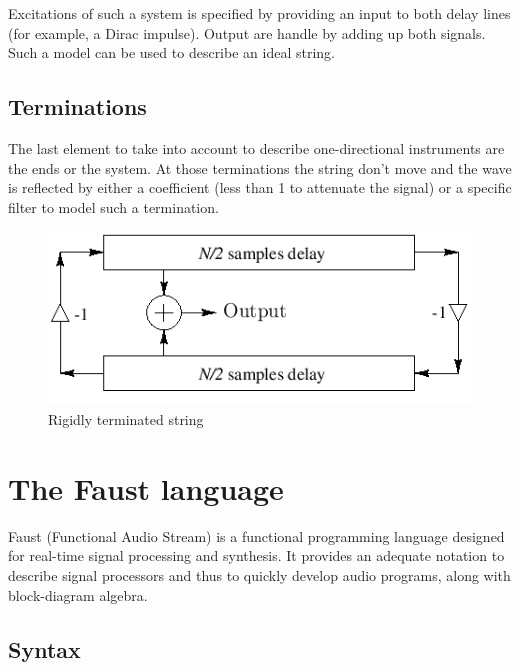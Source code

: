 \documentclass[11pt,a4paper]{article}
\begin{document}
Excitations of such a system is specified by providing an input to both delay lines (for example, a Dirac impulse). Output are handle by adding up both signals.\\
Such a model can be used to describe an ideal string.

\subsection*{Terminations}
The last element to take into account to describe one-directional instruments are the ends or the system. At those terminations the string don't move and the wave is reflected by either a coefficient (less than 1 to attenuate the signal) or a specific filter to model such a termination.

\begin{figure}
	\centering
	\includegraphics[scale=0.5]{Pictures/terminations.png}
	\caption{Rigidly terminated string}
	\label{fig:terminations}
\end{figure}

\section{The Faust language}

Faust (Functional Audio Stream) is a functional programming \cite{quickref} language designed for real-time signal processing and synthesis. It provides an adequate notation to describe signal processors and thus to quickly develop audio programs, along with block-diagram algebra.

\subsection*{Syntax}
\end{document}
